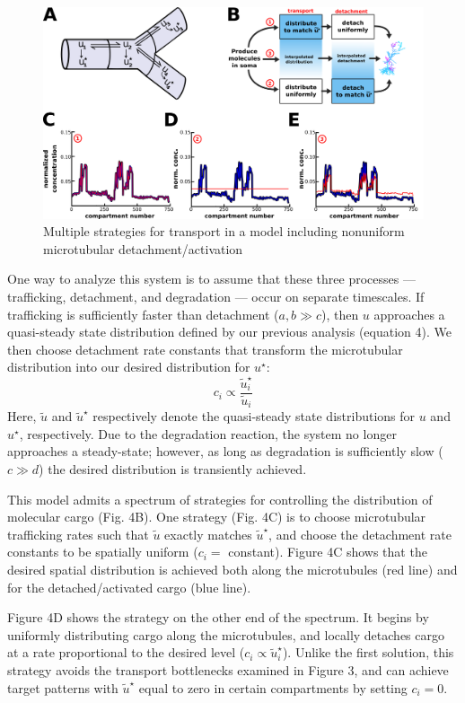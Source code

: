 \documentclass[10pt]{wlpeerj}
\begin{document}
\begin{figure}[!tb]
\begin{center}
\includegraphics[width=0.9\columnwidth]{04_sushi_belt.png}
\caption{Multiple strategies for transport in a model including nonuniform microtubular detachment/activation}
\end{center}
\end{figure}

One way to analyze this system is to assume that these three processes --- trafficking, detachment, and degradation --- occur on separate timescales.
If trafficking is sufficiently faster than detachment ($a,b \gg c$), then $u$ approaches a quasi-steady state distribution defined by our previous analysis (equation 4).
We then choose detachment rate constants that transform the microtubular distribution into our desired distribution for $u^\star$:
\begin{equation}
c_i \propto \frac{\tilde{u}^\star_i}{\tilde{u}_i}
\end{equation}
Here, $\tilde{u}$ and $\tilde{u}^\star$ respectively denote the quasi-steady state distributions for $u$ and $u^\star$, respectively.
Due to the degradation reaction, the system no longer approaches a steady-state; however, as long as degradation is sufficiently slow ($c \gg d$) the desired distribution is transiently achieved.

This model admits a spectrum of strategies for controlling the distribution of molecular cargo (Fig. 4B).
One strategy (Fig. 4C) is to choose microtubular trafficking rates such that $\tilde{u}$ exactly matches $\tilde{u}^\star$, and choose the detachment rate constants to be spatially uniform ($c_i =$ constant).
Figure 4C shows that the desired spatial distribution is achieved both along the microtubules (red line) and for the detached/activated cargo (blue line).

Figure 4D shows the strategy on the other end of the spectrum.
It begins by uniformly distributing cargo along the microtubules, and locally detaches cargo at a rate proportional to the desired level ($c_i \propto \tilde{u}^\star_i$).
Unlike the first solution, this strategy avoids the transport bottlenecks examined in Figure 3, and can achieve target patterns with  $\tilde{u}^\star$ equal to zero in certain compartments by setting $c_i = 0$. 
\end{document}
